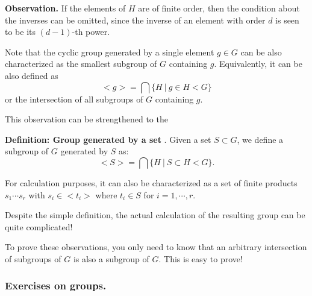 \documentclass[12pt]{article}
\newcommand{\deff}[1]{{\bf Definition: #1} }
\begin{document}
{\bf Observation.}
If the elements of $H$ are of finite order, then the condition about the
inverses can be omitted, since the inverse of an element with order $d$
is seen to be its $(d-1)$-th power.

Note that the cyclic group generated by a single element $g\in G$ can be
also characterized as the smallest subgroup of $G$ containing $g$.
Equivalently, it can be also defined as 
$$<g> = \bigcap\{H ~|~ g \in H < G\}$$
or the intersection of all subgroups of $G$ containing $g$. 

This observation can be strengthened to the 

\deff{Group generated by a set}.
Given a set $S\subset G$, we define a subgroup of $G$ generated by $S$
as:
$$<S>= \bigcap \{ H ~|~ S \subset H < G\}.$$

For calculation purposes, it can also be characterized as a set of
finite products
$s_1\cdots s_r$ with $s_i\in <t_i> $ where $t_i\in S$ for $i=1,\cdots,
r$.

Despite the simple definition, the actual calculation of the resulting
group can be quite complicated!

To prove these observations, you only need to know that an arbitrary
intersection of subgroups of $G$ is also a subgroup of $G$. This is
easy to prove!

\subsubsection{Exercises on  groups.}
\end{document}
